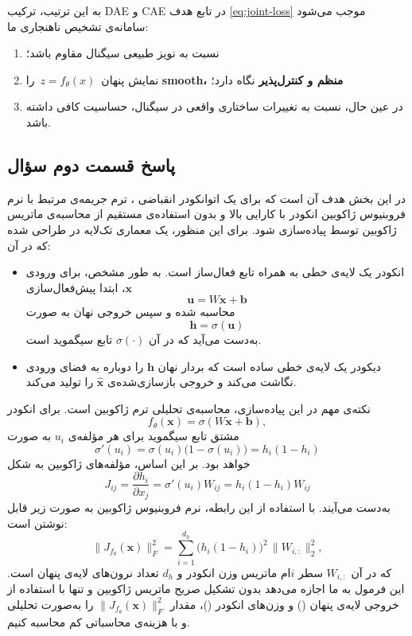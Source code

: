 \documentclass{article}
\begin{document}
به این ترتیب، ترکیب DAE و CAE در تابع هدف \eqref{eq:joint-loss} موجب می‌شود سامانه‌ی تشخیص ناهنجاری ما:
\begin{enumerate}
	\item نسبت به نویز طبیعی سیگنال مقاوم باشد؛
	\item نمایش پنهان \(\,z=f_\theta(x)\,\) را \textbf{smooth، منظم و کنترل‌پذیر} نگاه دارد؛
	\item در عین حال، نسبت به تغییرات ساختاری واقعی در سیگنال، حساسیت کافی داشته باشد.
\end{enumerate}

\subsection{پاسخ قسمت دوم سؤال}
در این بخش هدف آن است که برای یک اتوانکودر انقباضی ،
ترم جریمه‌ی مرتبط با نرم فروبنیوس ژاکوبین انکودر با کارایی بالا و بدون استفاده‌ی مستقیم
از محاسبه‌ی ماتریس ژاکوبین توسط  پیاده‌سازی شود. برای این منظور، یک معماری
تک‌لایه در  طراحی شده که در آن:

\begin{itemize}
	\item انکودر یک لایه‌ی خطی به همراه تابع فعال‌ساز  است. به طور مشخص، برای ورودی $\mathbf{x}$، ابتدا پیش‌فعال‌سازی
	\[
	\mathbf{u} = W \mathbf{x} + \mathbf{b}
	\]
	محاسبه شده و سپس خروجی نهان به صورت
	\[
	\mathbf{h} = \sigma(\mathbf{u})
	\]
	به‌دست می‌آید که در آن $\sigma(\cdot)$ تابع سیگموید است.
	
	\item دیکودر یک لایه‌ی خطی ساده است که بردار نهان $\mathbf{h}$ را دوباره به فضای ورودی نگاشت می‌کند و خروجی بازسازی‌شده‌ی $\hat{\mathbf{x}}$ را تولید می‌کند.
\end{itemize}

نکته‌ی مهم در این پیاده‌سازی، محاسبه‌ی تحلیلی ترم ژاکوبین است. برای انکودر
\[
f_\theta(\mathbf{x}) = \sigma(W \mathbf{x} + \mathbf{b}),
\]
مشتق تابع سیگموید برای هر مؤلفه‌ی $u_i$ به صورت
\[
\sigma'(u_i) = \sigma(u_i)\bigl(1 - \sigma(u_i)\bigr) = h_i (1 - h_i)
\]
خواهد بود. بر این اساس، مؤلفه‌های ژاکوبین به شکل
\[
J_{ij} = \frac{\partial h_i}{\partial x_j}
= \sigma'(u_i) W_{ij}
= h_i (1 - h_i) W_{ij}
\]
به‌دست می‌آیند. با استفاده از این رابطه، نرم فروبنیوس ژاکوبین به صورت زیر قابل نوشتن است:
\[
\bigl\|J_{f_\theta}(\mathbf{x})\bigr\|_F^2
=
\sum_{i=1}^{d_h}
\bigl(h_i (1 - h_i)\bigr)^2
\,\bigl\|W_{i,:}\bigr\|_2^2,
\]
که در آن $W_{i,:}$ سطر $i$ام ماتریس وزن انکودر و $d_h$ تعداد نرون‌های لایه‌ی پنهان است.
این فرمول به ما اجازه می‌دهد بدون تشکیل صریح ماتریس ژاکوبین و تنها با استفاده از
خروجی لایه‌ی پنهان () و وزن‌های انکودر ()، مقدار
$\|J_{f_\theta}(\mathbf{x})\|_F^2$ را به‌صورت تحلیلی و با هزینه‌ی محاسباتی کم
محاسبه کنیم.
\end{document}
